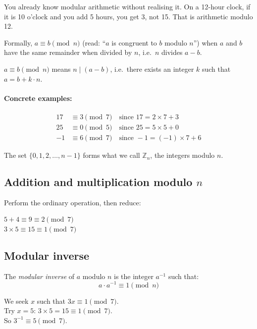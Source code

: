 \documentclass[11pt,a4paper]{article}
\begin{document}
You already know modular arithmetic without realising it. On a 12-hour clock, if it is 10 o'clock and you add 5 hours, you get 3, not 15. That is arithmetic modulo 12.

Formally, $a \equiv b \pmod{n}$ (read: ``$a$ is congruent to $b$ modulo $n$'') when $a$ and $b$ have the same remainder when divided by $n$, i.e.\ $n$ divides $a - b$.

\begin{infobox}[Definition]
$a \equiv b \pmod{n}$ means $n \mid (a - b)$, i.e.\ there exists an integer $k$ such that $a = b + k \cdot n$.
\end{infobox}

\paragraph{Concrete examples:}
\begin{align*}
17 &\equiv 3 \pmod{7} \quad \text{since } 17 = 2 \times 7 + 3 \\
25 &\equiv 0 \pmod{5} \quad \text{since } 25 = 5 \times 5 + 0 \\
-1 &\equiv 6 \pmod{7} \quad \text{since } -1 = (-1) \times 7 + 6
\end{align*}

The set $\{0, 1, 2, \ldots, n-1\}$ forms what we call $\mathbb{Z}_n$, the integers modulo $n$.

\subsection{Addition and multiplication modulo $n$}

Perform the ordinary operation, then reduce:

\begin{infobox}
$5 + 4 \equiv 9 \equiv 2 \pmod{7}$ \\
$3 \times 5 \equiv 15 \equiv 1 \pmod{7}$
\end{infobox}

\subsection{Modular inverse}

The \emph{modular inverse} of $a$ modulo $n$ is the integer $a^{-1}$ such that:
\[a \cdot a^{-1} \equiv 1 \pmod{n}\]

\begin{resultbox}
We seek $x$ such that $3x \equiv 1 \pmod{7}$.\\
Try $x = 5$: $3 \times 5 = 15 \equiv 1 \pmod{7}$. \checkmark \\
So $3^{-1} \equiv 5 \pmod{7}$.
\end{resultbox}
\end{document}
